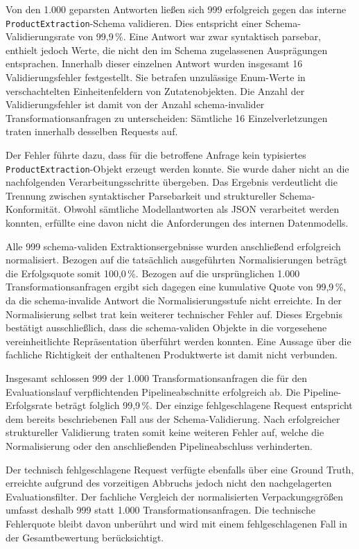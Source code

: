 Von den 1.000 geparsten Antworten ließen sich 999 erfolgreich gegen das interne \texttt{ProductExtraction}-Schema validieren. Dies entspricht einer Schema-Validierungsrate von 99,9\,\%. Eine Antwort war zwar syntaktisch parsebar, enthielt jedoch Werte, die nicht den im Schema zugelassenen Ausprägungen entsprachen. Innerhalb dieser einzelnen Antwort wurden insgesamt 16 Validierungsfehler festgestellt. Sie betrafen unzulässige Enum-Werte in verschachtelten Einheitenfeldern von Zutatenobjekten. Die Anzahl der Validierungsfehler ist damit von der Anzahl schema-invalider Transformationsanfragen zu unterscheiden: Sämtliche 16 Einzelverletzungen traten innerhalb desselben Requests auf.

Der Fehler führte dazu, dass für die betroffene Anfrage kein typisiertes \texttt{ProductExtraction}-Objekt erzeugt werden konnte. Sie wurde daher nicht an die nachfolgenden Verarbeitungsschritte übergeben. Das Ergebnis verdeutlicht die Trennung zwischen syntaktischer Parsebarkeit und struktureller Schema-Konformität. Obwohl sämtliche Modellantworten als JSON verarbeitet werden konnten, erfüllte eine davon nicht die Anforderungen des internen Datenmodells.

Alle 999 schema-validen Extraktionsergebnisse wurden anschließend erfolgreich normalisiert. Bezogen auf die tatsächlich ausgeführten Normalisierungen beträgt die Erfolgsquote somit 100,0\,\%. Bezogen auf die ursprünglichen 1.000 Transformationsanfragen ergibt sich dagegen eine kumulative Quote von 99,9\,\%, da die schema-invalide Antwort die Normalisierungsstufe nicht erreichte. In der Normalisierung selbst trat kein weiterer technischer Fehler auf. Dieses Ergebnis bestätigt ausschließlich, dass die schema-validen Objekte in die vorgesehene vereinheitlichte Repräsentation überführt werden konnten. Eine Aussage über die fachliche Richtigkeit der enthaltenen Produktwerte ist damit nicht verbunden.

Insgesamt schlossen 999 der 1.000 Transformationsanfragen die für den Evaluationslauf verpflichtenden Pipelineabschnitte erfolgreich ab. Die Pipeline-Erfolgsrate beträgt folglich 99,9\,\%. Der einzige fehlgeschlagene Request entspricht dem bereits beschriebenen Fall aus der Schema-Validierung. Nach erfolgreicher struktureller Validierung traten somit keine weiteren Fehler auf, welche die Normalisierung oder den anschließenden Pipelineabschluss verhinderten.

Der technisch fehlgeschlagene Request verfügte ebenfalls über eine Ground Truth, erreichte aufgrund des vorzeitigen Abbruchs jedoch nicht den nachgelagerten Evaluationsfilter. Der fachliche Vergleich der normalisierten Verpackungsgrößen umfasst deshalb 999 statt 1.000 Transformationsanfragen. Die technische Fehlerquote bleibt davon unberührt und wird mit einem fehlgeschlagenen Fall in der Gesamtbewertung berücksichtigt.

